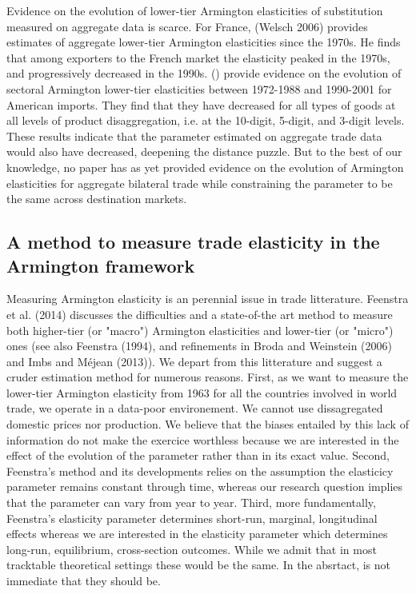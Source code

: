 \documentclass[12pt,twoside,a4paper,notitlepage]{article}
\begin{document}
Evidence on the evolution of lower-tier Armington elasticities of substitution measured on aggregate data is scarce. For France, (Welsch 2006) provides estimates of aggregate lower-tier Armington elasticities since the 1970s. He finds that among exporters to the French market the elasticity peaked in the 1970s, and progressively decreased in the 1990s. (\cite{Broda2006}) provide evidence on the evolution of sectoral Armington lower-tier elasticities between 1972-1988 and 1990-2001 for American imports. They find that they have decreased for all types of goods at all levels of product disaggregation, i.e. at the 10-digit, 5-digit, and 3-digit levels. These results indicate that the parameter estimated on aggregate trade data would also have decreased, deepening the distance puzzle. But to the best of our knowledge, no paper has as yet provided evidence on the evolution of Armington elasticities for aggregate bilateral trade while constraining the parameter to be the same across destination markets.

\subsection{ \label{ref-001}A method to measure trade elasticity in the Armington framework\label{mark-1.3.}}

Measuring Armington elasticity is an perennial issue in trade litterature. Feenstra et al. (2014) discusses the difficulties and a state-of-the art method to measure both higher-tier (or "macro") Armington elasticities and lower-tier (or "micro") ones (see also Feenstra (1994), and refinements in Broda and Weinstein (2006) and Imbs and M\'{e}jean (2013)). We depart from this litterature and suggest a cruder estimation method for numerous reasons. First, as we want to measure the lower-tier Armington elasticity from 1963 for all the countries involved in world trade, we operate in a data-poor environement. We cannot use dissagregated domestic prices nor production. We believe that the biases entailed by this lack of information do not make the exercice worthless because we are interested in the effect of the evolution of the parameter rather than in its exact value. Second, Feenstra's method and its developments relies on the assumption the elasticicy parameter remains constant through time, whereas our research question implies that the parameter can vary from year to year. Third, more fundamentally, Feenstra's elasticity parameter determines short-run, marginal, longitudinal effects whereas we are interested in the elasticity parameter which determines long-run, equilibrium, cross-section outcomes. While we admit that in most tracktable theoretical settings these would be the same. In the absrtact, is not immediate that they should be.
\end{document}
